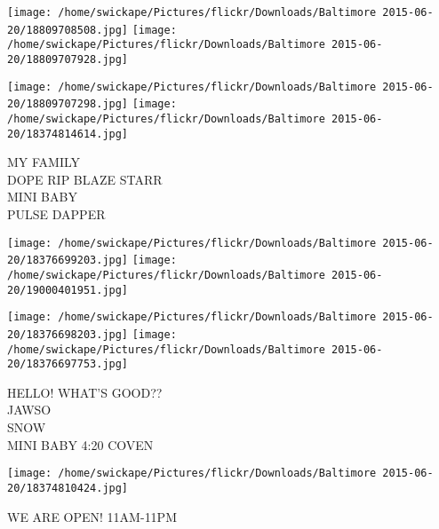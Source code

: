 \documentclass[10pt,letterpaper]{article}
\begin{document}
\texttt{[image: /home/swickape/Pictures/flickr/Downloads/Baltimore 2015-06-20/18809708508.jpg]}
\texttt{[image: /home/swickape/Pictures/flickr/Downloads/Baltimore 2015-06-20/18809707928.jpg]}

\texttt{[image: /home/swickape/Pictures/flickr/Downloads/Baltimore 2015-06-20/18809707298.jpg]}
\texttt{[image: /home/swickape/Pictures/flickr/Downloads/Baltimore 2015-06-20/18374814614.jpg]}

MY FAMILY\\
DOPE RIP BLAZE STARR\\
MINI BABY\\
PULSE DAPPER\\
\pagebreak

\texttt{[image: /home/swickape/Pictures/flickr/Downloads/Baltimore 2015-06-20/18376699203.jpg]}
\texttt{[image: /home/swickape/Pictures/flickr/Downloads/Baltimore 2015-06-20/19000401951.jpg]}

\texttt{[image: /home/swickape/Pictures/flickr/Downloads/Baltimore 2015-06-20/18376698203.jpg]}
\texttt{[image: /home/swickape/Pictures/flickr/Downloads/Baltimore 2015-06-20/18376697753.jpg]}

HELLO!  WHAT'S GOOD??\\
JAWSO\\
SNOW\\
MINI BABY 4:20 COVEN\\
\pagebreak

\texttt{[image: /home/swickape/Pictures/flickr/Downloads/Baltimore 2015-06-20/18374810424.jpg]}

WE ARE OPEN!  11AM{-}11PM\\
\pagebreak
\end{document}

